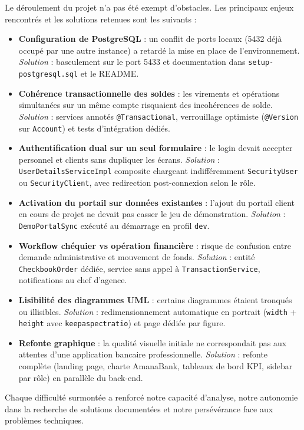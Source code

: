\documentclass[11pt,a4paper,oneside]{report}
\begin{document}
Le déroulement du projet n'a pas été exempt d'obstacles. Les principaux enjeux rencontrés et les solutions retenues sont les suivants :

\begin{itemize}
    \item \textbf{Configuration de PostgreSQL} : un conflit de ports locaux (5432 déjà occupé par une autre instance) a retardé la mise en place de l'environnement. \emph{Solution} : basculement sur le port 5433 et documentation dans \texttt{setup-postgresql.sql} et le README.
    \item \textbf{Cohérence transactionnelle des soldes} : les virements et opérations simultanées sur un même compte risquaient des incohérences de solde. \emph{Solution} : services annotés \texttt{@Transactional}, verrouillage optimiste (\texttt{@Version} sur \texttt{Account}) et tests d'intégration dédiés.
    \item \textbf{Authentification dual sur un seul formulaire} : le login devait accepter personnel et clients sans dupliquer les écrans. \emph{Solution} : \texttt{UserDetailsServiceImpl} composite chargeant indifféremment \texttt{SecurityUser} ou \texttt{SecurityClient}, avec redirection post-connexion selon le rôle.
    \item \textbf{Activation du portail sur données existantes} : l'ajout du portail client en cours de projet ne devait pas casser le jeu de démonstration. \emph{Solution} : \texttt{DemoPortalSync} exécuté au démarrage en profil \texttt{dev}.
    \item \textbf{Workflow chéquier vs opération financière} : risque de confusion entre demande administrative et mouvement de fonds. \emph{Solution} : entité \texttt{CheckbookOrder} dédiée, service sans appel à \texttt{TransactionService}, notifications au chef d'agence.
    \item \textbf{Lisibilité des diagrammes UML} : certains diagrammes étaient tronqués ou illisibles. \emph{Solution} : redimensionnement automatique en portrait (\texttt{width} + \texttt{height} avec \texttt{keepaspectratio}) et page dédiée par figure.
    \item \textbf{Refonte graphique} : la qualité visuelle initiale ne correspondait pas aux attentes d'une application bancaire professionnelle. \emph{Solution} : refonte complète (landing page, charte AmanaBank, tableaux de bord KPI, sidebar par rôle) en parallèle du back-end.
\end{itemize}

Chaque difficulté surmontée a renforcé notre capacité d'analyse, notre autonomie dans la recherche de solutions documentées et notre persévérance face aux problèmes techniques.
\end{document}
